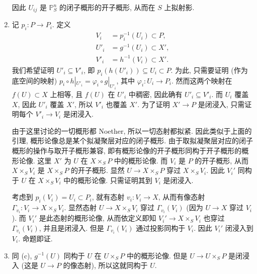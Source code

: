 \documentclass{article}
\theoremstyle{exercise}
\theoremstyle{plain}
\theoremstyle{remark}
\newenvironment{proofc}{\proof}{\endproof}
\def\P{\mathbb{P}}
\begin{document}
\begin{proofc}
\begin{enumerate}[label=(\alph*)]
          因此 $U_{ij}$ 是 $\P_S^n$ 的闭子概形的开子概形, 从而在 $S$ 上拟射影.
    \item 记 $p_i \colon P \to P_i$.
          定义
          \begin{align*}
            V_i &= p_i^{-1}(U_i) \subset P, \\
            U'_i &= g^{-1}(U_i) \subset X', \\
            V'_i &= h^{-1}(V_i) \subset X'.
          \end{align*}
          我们希望证明 $U'_i \subseteq V'_i$, 即 $p_i(h(U'_i)) \subseteq U_i \subset P$.
          为此, 只需要证明 (作为底空间的映射) $p_i \circ h|_{U'_i} = \varphi_i \circ g|_{U'_i}$,
          其中 $\varphi_i \colon U_i \to P_i$.
          然而这两个映射在 $f(U) \subset X$ 上相等, 且 $f(U)$ 在 $U'_i$ 中稠密,
          因此确有 $U'_i \subseteq V'_i$. 而 $U_i$ 覆盖 $X$, 因此 $U'_i$ 覆盖 $X'$,
          所以 $V'_i$ 也覆盖 $X'$. 为了证明 $X' \to P$ 是闭浸入,
          只需证明每个 $V'_i \to V_i$ 是闭浸入.

          由于这里讨论的一切概形都 Noether, 所以一切态射都拟紧.
          因此类似于上面的引理, 概形论像总是某个拟凝聚层对应的闭子概形.
          由于取拟凝聚层对应的闭子概形的操作与取开子概形兼容,
          即有概形论像的开子概形同构于开子概形的概形论像.
          这里 $X'$ 为 $U$ 在 $X \times_S P$ 中的概形论像.
          而 $V_i$ 是 $P$ 的开子概形, 从而 $X \times_S V_i$ 是 $X \times_S P$ 的开子概形.
          显然 $U \to X \times_S P$ 穿过 $X \times_S V_i$.
          因此 $V_i'$ 同构于 $U$ 在 $X \times_S V_i$ 中的概形论像.
          只需证明其到 $V_i$ 是闭浸入.

          考虑到 $p_i(V_i) = U_i \subset P_i$, 就有态射 $v_i \colon V_i \to X$,
          从而有像态射 $\Gamma_{v_i} \colon V_i \to X \times_S V_i$.
          显然态射 $U \to X \times_S V_i$ 穿过 $\Gamma_{v_i}(V_i)$
          (因为 $U \to X$ 穿过 $V_i$).
          而 $V_i'$ 是此态射的概形论像, 从而依定义即知 $V_i' \to X \times_S V_i$
          也穿过 $\Gamma_{v_i}(V_i)$, 并且是闭浸入.
          但是 $\Gamma_{v_i}(V_i)$ 通过投影同构于 $V_i$. 因此 $V_i'$ 闭浸入到 $V_i$.
          命题即证.
    \item 同 (c), $g^{-1}(U)$ 同构于 $U$ 在 $U \times_S P$ 中的概形论像.
          但是 $U \to U \times_S P$ 是闭浸入 (这是 $U \to P$ 的像态射),
          所以这就同构于 $U$. \qedhere
  \end{enumerate}
\end{proofc}
\end{document}
